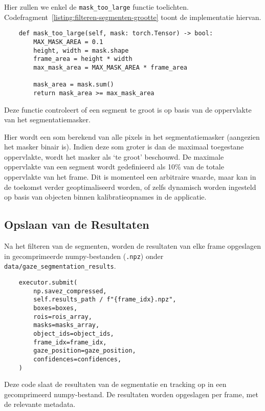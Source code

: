 Hier zullen we enkel de \texttt{mask\_too\_large} functie toelichten.
Codefragment~\ref{listing:filteren-segmenten-grootte} toont de implementatie hiervan.

\begin{listing}[H]
  \begin{verbatim}
    def mask_too_large(self, mask: torch.Tensor) -> bool:
        MAX_MASK_AREA = 0.1
        height, width = mask.shape
        frame_area = height * width
        max_mask_area = MAX_MASK_AREA * frame_area

        mask_area = mask.sum()
        return mask_area >= max_mask_area
    \end{verbatim}
  \caption[Filteren van segmenten op basis van grootte]{
    \label{listing:filteren-segmenten-grootte}  
    Deze functie controleert of een segment te groot is op basis van de oppervlakte van het segmentatiemasker. 
  }
\end{listing}

Hier wordt een som berekend van alle pixels in het segmentatiemasker (aangezien het masker binair is).
Indien deze som groter is dan de maximaal toegestane oppervlakte, wordt het masker als `te groot' beschouwd.
De maximale oppervlakte van een segment wordt gedefinieerd als 10\% van de totale oppervlakte van het frame.
Dit is momenteel een arbitraire waarde, maar kan in de toekomst verder geoptimaliseerd worden, of zelfs 
dynamisch worden ingesteld op basis van objecten binnen kalibratieopnames in de applicatie.

\subsection{Opslaan van de Resultaten}

Na het filteren van de segmenten, worden de resultaten van elke frame opgeslagen in gecomprimeerde numpy-bestanden 
(\texttt{.npz}) onder \texttt{data/gaze\_segmentation\_results}.

\begin{listing}[H]
  \begin{verbatim}
    executor.submit(
        np.savez_compressed,
        self.results_path / f"{frame_idx}.npz",
        boxes=boxes,
        rois=rois_array,
        masks=masks_array,
        object_ids=object_ids,
        frame_idx=frame_idx,
        gaze_position=gaze_position,
        confidences=confidences,
    )
    \end{verbatim}
  \caption[Opslaan van segmentatie-resultaten]{
    \label{listing:opslaan-segmentatie-resultaten}
    Deze code slaat de resultaten van de segmentatie en tracking op in een gecomprimeerd numpy-bestand.
    De resultaten worden opgeslagen per frame, met de relevante metadata.
  }
\end{listing}

